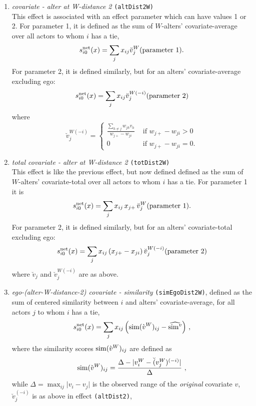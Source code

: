 \documentclass[a4paper,fleqn,11pt]{article}
\newcommand{\+}{\, + \,}
\newcommand{\vit}{\theenumi}
\newcounter{savenumi}
\begin{document}
\begin{enumerate}
\setcounter{enumi}{\value{savenumi}}

\item \emph{covariate - alter at W-distance 2} \texttt{(altDist2W)} \\ %
      This effect is associated with an effect parameter
      which can have values 1 or 2.
      For parameter 1, it is
      defined as the sum of $W$-alters' covariate-average over all actors
      to whom $i$ has a tie,
\[
 s^{\rm net}_{i\vit}(x) = \sum_j x_{ij} \breve v_j^W \hfill (\text{parameter 1}). \hfill
\]
      For parameter 2, it is defined similarly,
      but for an alters' covariate-average excluding
      ego:
\[
 s^{\rm net}_{i\vit}(x) = \sum_j x_{ij} \breve v_j^{W(-i)} \hfill (\text{parameter 2}) \hfill
\]
      where
\begin{equation}
  \breve v_j^{W(-i)} = \left\{\begin{array}{ll} \displaystyle
         \frac{\sum_{h \neq j} w_{jh}v_h}{w_{j+} - w_{ji}}  &  \text{ if } w_{j+} - w_{ji} > 0     \\
         0                                &  \text{ if } w_{j+}- w_{ji} = 0  .
  \end{array}   \right.
\end{equation}

\item \emph{total covariate - alter at W-distance 2} \texttt{(totDist2W)} \\
      This effect is like the previous effect, but now defined
      defined as the sum of $W$-alters' covariate-total over all actors
      to whom $i$ has a tie. For parameter 1 it is
\[
 s^{\rm net}_{i\vit}(x) = \sum_j x_{ij}\, x_{j+} \, \breve v_j^W \hfill (\text{parameter 1}). \hfill
\]
      For parameter 2, it is defined similarly,
      but for an alters' covariate-total excluding
      ego:
\[
 s^{\rm net}_{i\vit}(x) = \sum_j x_{ij} \, (x_{j+}  - x_{ji}) \,
               \breve v_j^{W(-i)} \hfill (\text{parameter 2}) \hfill
\]
      where $ \breve v_j$ and $ \breve v_j^{W(-i)}$ are as above.

\item \emph{ego-(alter-W-distance-2) covariate - similarity} \texttt{(simEgoDist2W)},
      defined as the sum of centered similarity  between $i$
      and alters' covariate-average, for all actors
      $j$ to whom $i$ has a tie,
\[
 s^{\rm net}_{i\vit}(x) = \sum_j x_{ij}\, \Big({\rm sim}(\grave v^W)_{ij}
  - \widehat{{\rm sim}^v}\Big) \ ,
\]
 where the similarity scores ${\rm sim}(\grave v^W)_{ij}$ are defined as
\[
{\rm sim}(\grave v^W)_{ij}=
 \frac{\Delta-\vert  v^W_i - \breve (v^W_j)^{(-i)} \vert}{\Delta} \ ,
\]
 while
 $\Delta=\max_{ij}\vert v_i - v_j \vert$ is the observed range of the
 \emph{original} covariate $v$,
 $\breve v_j^{(-i)}$ is as above in effect \texttt{(altDist2)},


\end{enumerate}
\end{document}
